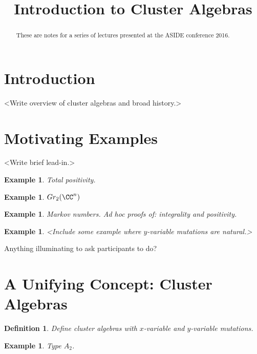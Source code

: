 \documentclass{amsart}
\title{Introduction to Cluster Algebras}
\newtheorem{definition}[theorem]{Definition}
\newtheorem{example}[theorem]{Example}
\theoremstyle{remark}
\numberwithin{equation}{section}
\begin{document}
\begin{abstract}
  These are notes for a series of lectures presented at the ASIDE conference 2016.
\end{abstract}
\maketitle

\section{Introduction}
  <Write overview of cluster algebras and broad history.>

\section{Motivating Examples}
  <Write brief lead-in.>
  \begin{example}
    Total positivity.
  \end{example}

  \begin{example}
    $Gr_{2}(\CC^n)$
  \end{example}

  \begin{example}
    Markov numbers. Ad hoc proofs of: integrality and positivity.
  \end{example}

  \begin{example}
    <Include some example where $y$-variable mutations are natural.>
  \end{example}

  \begin{exercise}
    Anything illuminating to ask participants to do?
  \end{exercise}

\section{A Unifying Concept: Cluster Algebras}

  \begin{definition}
    Define cluster algebras with $x$-variable and $y$-variable mutations.
  \end{definition}

  \begin{example}
    Type $A_2$.
  \end{example}
\end{document}
